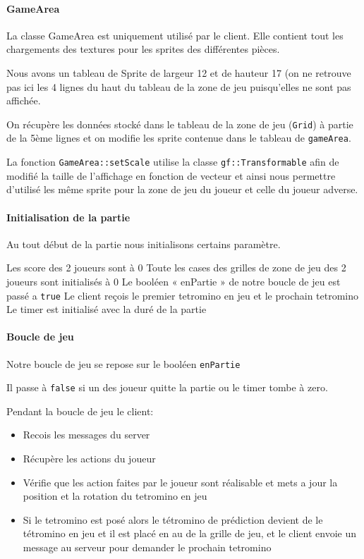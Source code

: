 \documentclass[a4paper, 12pt]{article}
\begin{document}
			\paragraph{GameArea}

			La classe GameArea est uniquement utilisé par le client. Elle contient tout les chargements des textures pour les sprites des différentes pièces.

			Nous avons un tableau de Sprite de largeur 12 et de hauteur 17 (on ne retrouve pas ici les 4 lignes du haut du tableau de la zone de jeu puisqu’elles ne sont pas affichée.

			On récupère les données stocké dans le tableau de la zone de jeu (\texttt{Grid}) à partie de la 5ème lignes et on modifie les sprite contenue dans le tableau de \texttt{gameArea}.

			La fonction \texttt{GameArea::setScale} utilise la classe \texttt{gf::Transformable} afin de modifié la taille de l’affichage en fonction de vecteur et ainsi nous permettre d’utilisé les même sprite pour la zone de jeu du joueur et celle du joueur adverse.

			\paragraph{Initialisation de la partie}

				Au tout début de la partie nous initialisons certains paramètre.

				Les score des 2 joueurs sont à 0
				Toute les cases des grilles de zone de jeu des 2 joueurs sont initialisés à 0
				Le booléen « enPartie » de notre boucle de jeu est passé a \texttt{true}
				Le client reçois le premier tetromino en jeu et le prochain tetromino
				Le timer est initialisé avec la duré de la partie


			\paragraph{Boucle de jeu}

			Notre boucle de jeu se repose sur le booléen \texttt{enPartie}

			Il passe à \texttt{false} si un des joueur quitte la partie ou le timer tombe à zero.

			Pendant la boucle de jeu le client:

	\begin{itemize}
		\item Recois les messages du server
		\item Récupère les actions du joueur
		\item Vérifie que les action faites par le joueur sont réalisable et mets a jour la position et la rotation du tetromino en jeu
		\item Si le tetromino est posé alors le tétromino de prédiction devient de le tétromino en jeu et il est placé en au de la grille de jeu, et le client envoie un message au serveur pour demander le prochain tetromino
	\end{itemize}
\end{document}
